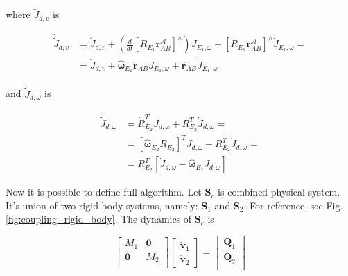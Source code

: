 where $\dot{\tilde{J}}_{d,v}$ is 

\begin{equation}
    \begin{aligned}
        \dot{\tilde{J}}_{d,v} & = \dot{J}_{d,v} + 
        \left( \frac{d}{dt} [R_{E_1} \mathbf{r}_{AB}^{\mathcal{A}}]^\wedge \right)
        J_{E_1, \omega} + 
        [R_{E_1} \mathbf{r}_{AB}^{\mathcal{A}}]^\wedge \dot{J}_{E_1, \omega} = \\
        & = \dot{J}_{d,v} + 
        \hat{\boldsymbol{\omega}}_{E_1} \hat{\mathbf{r}}_{AB} J_{E_1, \omega}
        + \hat{\mathbf{r}}_{AB} \dot{J}_{E_1, \omega}
    \end{aligned}
    \label{eqn:jac_lin_derivatives}
\end{equation}

and $\dot{\tilde{J}}_{d,\omega}$ is

\begin{equation}
    \begin{aligned}
        \dot{\tilde{J}}_{d,\omega} 
        & = 
        \dot{R}_{E_2}^T J_{d, \omega} + 
        R_{E_2}^T \dot{J}_{d, \omega}
        = \\
        & = 
        [\hat{\boldsymbol{\omega}}_{E_2} R_{E_2}]^T J_{d, \omega} + 
        R_{E_2}^T \dot{J}_{d, \omega} = \\
        & = R_{E_2}^T
        [\dot{J}_{d, \omega} - \hat{\boldsymbol{\omega}}_{E_2} J_{d, \omega}]
    \end{aligned}
    \label{eqn:jac_ang_derivatives}
\end{equation}

Now it is possible to define full algorithm. Let $\mathbf{S}_c$ is combined 
physical system. It's union of two rigid-body systems, namely: $\mathbf{S}_1$ and 
$\mathbf{S}_2$. For reference, see Fig. \ref{fig:coupling_rigid_body}. The dynamics 
of $\mathbf{S}_c$ is 

\begin{equation}
    \begin{bmatrix}
        M_1 & \mathbf{0} \\
        \mathbf{0} & M_2 \\ 
    \end{bmatrix}
    \begin{bmatrix}
        \dot{\mathbf{v}}_1 \\
        \dot{\mathbf{v}}_2
    \end{bmatrix}
    = 
    \begin{bmatrix}
        \mathbf{Q}_1 \\
        \mathbf{Q}_2 \\
    \end{bmatrix}
    \label{eqn:comb_system}
\end{equation}

